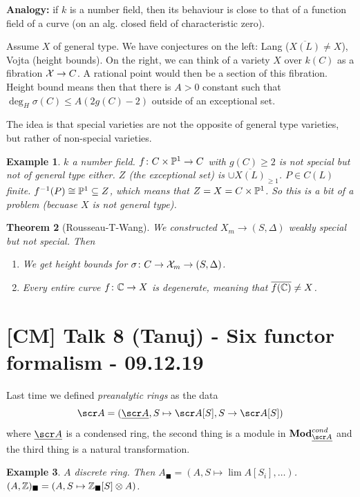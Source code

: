 \documentclass[A4paper, british, reqno]{amsart}
\theoremstyle{darkgreentheorem}
\newtheorem{thm}{Theorem}[section]
\theoremstyle{darkbluedefinition}
\theoremstyle{darkredexample}
\newtheorem{exa}[thm]{Example}
\theoremstyle{remark}
\newcommand{\1}{\mathbbm{1}}
\renewcommand{\u}[1]{\underline{#1}}
\newcommand{\ot}{\otimes}
\newcommand{\sub}{\subseteq}
\newcommand{\usolid}{_{\blacksquare}}
\begin{document}
\textbf{Analogy:} if $k$ is a number field, then its behaviour is close to that of a function field of a curve (on an alg. closed field of characteristic zero).

Assume $X$ of general type.
We have conjectures on the left: Lang ($\overline{X(L)}\neq X$), Vojta (height bounds).
On the right, we can think of a variety $X$ over $k(C)$ as a fibration $\X\to C$.
A rational point would then be a section of this fibration.
Height bound means then that there is $A>0$ constant such that $\deg_{H}\sigma(C)\leqslant A(2g(C)-2)$ outside of an exceptional set.

The idea is that special varieties are not the opposite of general type varieties, but rather of non-special varieties.

\begin{exa}
    $k$ a number field.
    $f\colon C\times \P^{1}\to C$ with $g(C)\geqslant 2$ is not special but not of general type either.
    $Z$ (the exceptional set) is $\cup \overline{X(L)}_{\geqslant 1}$.
    $P\in C(L)$ finite.
    $f^{-1}(P)\cong \P^{1}\sub Z$, which means that $Z=X=C\times \P^{1}$.
    So this is a bit of a problem (becuase $X$ is not general type).
\end{exa}

\begin{thm}[Rousseau-T-Wang]
    We constructed $X_{m}\to (S,\Delta)$ weakly special but not special.
    Then
    \begin{enumerate}
	\item We get height bounds for $\sigma \colon C\to \X_{m}\to (S,\Delta)$.
	\item Every entire curve $f\colon \C\to X$ is degenerate, meaning that $\overline{f(\C)}\neq X$.
    \end{enumerate}
\end{thm}

\section{[CM] Talk 8 (Tanuj) - Six functor formalism - 09.12.19}

Last time we defined \textit{preanalytic rings} as the data
\[ \sA=(\u{\sA},S\mapsto \sA[S],S\to \sA[S] ) \]
where $\u{\sA}$ is a condensed ring, the second thing is a module in $\Mod_{\u{\sA}}^{cond}$ and the third thing is a natural transformation.

\begin{exa}
    $A$ discrete ring.
    Then $A\usolid=(A,S\mapsto \lim A[S_{i}],\ldots )$.
    $(A,\Z)\usolid=(A,S\mapsto \Z\usolid [S]\ot A)$.
\end{exa}
\end{document}
